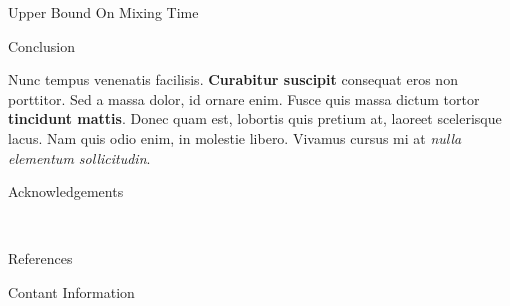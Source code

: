 \documentclass[final]{beamer}
\newlength{\onecolwid}
\begin{document}
\begin{frame}[t]
\begin{columns}[t]
\begin{column}{\onecolwid}
\begin{block}{Upper Bound On Mixing Time}
\end{block}


\begin{block}{Conclusion}

Nunc tempus venenatis facilisis. \textbf{Curabitur suscipit} consequat eros non porttitor. Sed a massa dolor, id ornare enim. Fusce quis massa dictum tortor \textbf{tincidunt mattis}. Donec quam est, lobortis quis pretium at, laoreet scelerisque lacus. Nam quis odio enim, in molestie libero. Vivamus cursus mi at \textit{nulla elementum sollicitudin}.

\end{block}


\begin{block}{Acknowledgements}

\small{} \\

\end{block}



\begin{block}{References}

\nocite{*} %
\small{
\vspace{0.75in}}

\end{block}




\begin{block}{Contant Information}


\end{block}
\end{column}
\end{columns}
\end{frame}
\end{document}
